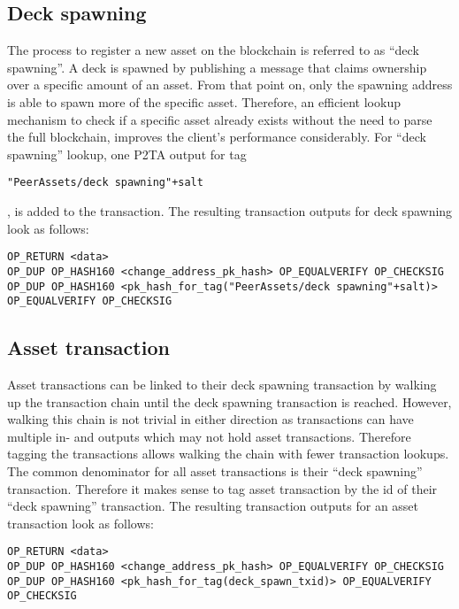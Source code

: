 \documentclass[a4paper,10pt]{article}
\begin{document}
\subsection{Deck spawning}
The process to register a new asset on the blockchain is referred to as ``deck spawning''. A deck is spawned by publishing a message that claims ownership over a specific amount of an asset. From that point on, only the spawning address is able to spawn more of the specific asset. Therefore, an efficient lookup mechanism to check if a specific asset already exists without the need to parse the full blockchain, improves the client's performance considerably.
For ``deck spawning'' lookup, one P2TA output for tag \begin{small}\verb|"PeerAssets/deck spawning"+salt|\end{small}, is added to the transaction.
The resulting transaction outputs for deck spawning look as follows:
\begin{scriptsize}\begin{verbatim}
OP_RETURN <data>
OP_DUP OP_HASH160 <change_address_pk_hash> OP_EQUALVERIFY OP_CHECKSIG
OP_DUP OP_HASH160 <pk_hash_for_tag("PeerAssets/deck spawning"+salt)> OP_EQUALVERIFY OP_CHECKSIG
\end{verbatim}\end{scriptsize}

\subsection{Asset transaction}
Asset transactions can be linked to their deck spawning transaction by walking up the transaction chain until the deck spawning transaction is reached.
However, walking this chain is not trivial in either direction as transactions can have multiple in- and outputs which may not hold asset transactions.
Therefore tagging the transactions allows walking the chain with fewer transaction lookups.
The common denominator for all asset transactions is their ``deck spawning'' transaction.
Therefore it makes sense to tag asset transaction by the id of their ``deck spawning'' transaction.
The resulting transaction outputs for an asset transaction look as follows:
\begin{scriptsize}\begin{verbatim}
OP_RETURN <data>
OP_DUP OP_HASH160 <change_address_pk_hash> OP_EQUALVERIFY OP_CHECKSIG
OP_DUP OP_HASH160 <pk_hash_for_tag(deck_spawn_txid)> OP_EQUALVERIFY OP_CHECKSIG
\end{verbatim}\end{scriptsize}
\end{document}
